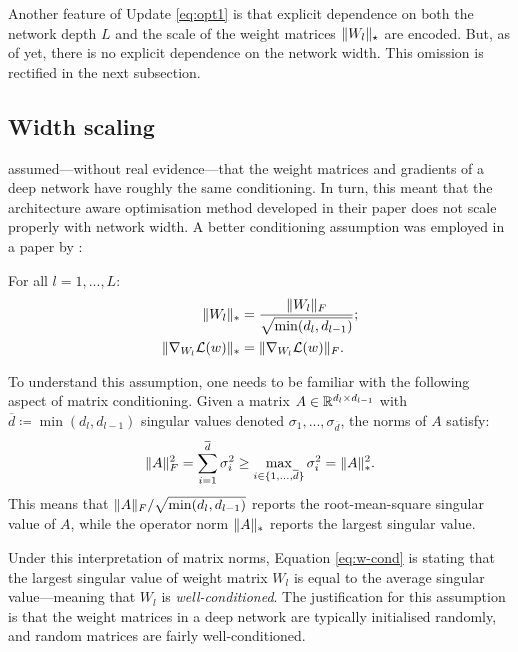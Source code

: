 \begin{refsection}
Another feature of Update \ref{eq:opt1} is that explicit dependence on both the network depth $L$ and the scale of the weight matrices $\Vert {W_l} \Vert_\star$ are encoded. But, as of yet, there is no explicit dependence on the network width. This omission is rectified in the next subsection.

\subsection{Width scaling}

\citet{my-fromage} assumed---without real evidence---that the weight matrices and gradients of a deep network have roughly the same conditioning. In turn, this meant that the architecture aware optimisation method developed in their paper does not scale properly with network width. A better conditioning assumption was employed in a paper by \citet{yang2021tuning}:

\begin{assumption}\label{ass:cond} For all $l=1,...,L$:
\begin{align}
    \Vert {W_l} \Vert_* &= \frac{\Vert {W_l} \Vert_F}{\sqrt{\min(d_l,d_{l-1})}}; \label{eq:w-cond} \\ \Vert {\nabla_{W_l}\mathcal{L}(w)} \Vert_* &= \Vert {\nabla_{W_l}\mathcal{L}(w)} \Vert_F.\label{eq:g-cond}
\end{align}
\end{assumption}
To understand this assumption, one needs to be familiar with the following aspect of matrix conditioning. Given a matrix $A\in\mathbb{R}^{d_l\times d_{l-1}}$ with $\overline{d} \coloneqq \min(d_l,d_{l-1})$ singular values denoted $\sigma_1, ..., \sigma_{\overline{d}}$, the norms of $A$ satisfy:
\begin{equation}\label{eq:frob-vs-op}
    \Vert {A} \Vert_F^2 = \sum_{i=1}^{\overline{d}} \sigma_i^2 \geq \max_{i\in\{1,...,\overline{d}\}} \sigma_i^2 = \Vert {A} \Vert_*^2.
\end{equation}
This means that $\Vert {A} \Vert_F/\sqrt{\min(d_l,d_{l-1})}$ reports the root-mean-square singular value of $A$, while the operator norm $\Vert {A} \Vert_*$ reports the largest singular value. 

Under this interpretation of matrix norms, Equation \ref{eq:w-cond} is stating that the largest singular value of weight matrix $W_l$ is equal to the average singular value---meaning that $W_l$ is \textit{well-conditioned}. The justification for this assumption is that the weight matrices in a deep network are typically initialised randomly, and random matrices are fairly well-conditioned.


\end{refsection}
